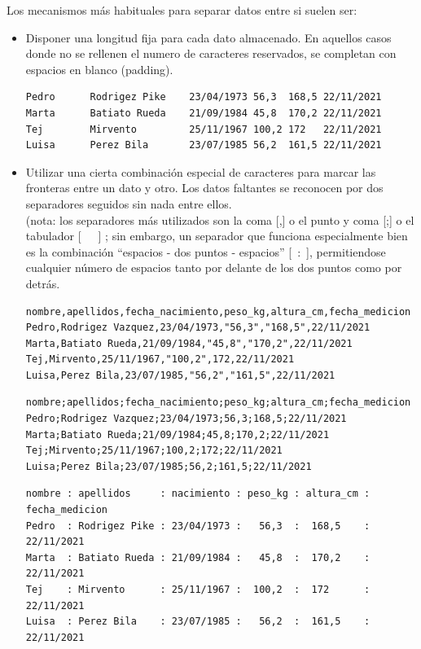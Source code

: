 \documentclass[spanish,12pt,a4paper,final,oneside]{book}
\begin{document}
Los mecanismos más habituales para separar datos entre si suelen ser:
\begin{itemize}
\item Disponer una longitud fija para cada dato almacenado. En aquellos casos donde no se rellenen el numero de caracteres reservados, se completan con espacios en blanco (padding).

\begin{lstlisting}[frame=single, basicstyle=\scriptsize]
Pedro      Rodrigez Pike    23/04/1973 56,3  168,5 22/11/2021
Marta      Batiato Rueda    21/09/1984 45,8  170,2 22/11/2021
Tej        Mirvento         25/11/1967 100,2 172   22/11/2021
Luisa      Perez Bila       23/07/1985 56,2  161,5 22/11/2021
\end{lstlisting}

\item Utilizar una cierta combinación especial de caracteres para marcar las fronteras entre un dato y otro. Los datos faltantes se reconocen por dos separadores seguidos sin nada entre ellos.
\\ (nota: los separadores más utilizados son la coma [,] o el punto y coma [;] o el tabulador [\ \ \ ] ; sin embargo, un separador que funciona especialmente bien es la combinación “espacios - dos puntos - espacios”  [\ :\ ], permitiendose cualquier número de espacios tanto por delante de los dos puntos como por detrás.

\begin{lstlisting}[frame=single, basicstyle=\scriptsize]
nombre,apellidos,fecha_nacimiento,peso_kg,altura_cm,fecha_medicion
Pedro,Rodrigez Vazquez,23/04/1973,"56,3","168,5",22/11/2021
Marta,Batiato Rueda,21/09/1984,"45,8","170,2",22/11/2021
Tej,Mirvento,25/11/1967,"100,2",172,22/11/2021
Luisa,Perez Bila,23/07/1985,"56,2","161,5",22/11/2021
\end{lstlisting}

\begin{lstlisting}[frame=single, basicstyle=\scriptsize]
nombre;apellidos;fecha_nacimiento;peso_kg;altura_cm;fecha_medicion
Pedro;Rodrigez Vazquez;23/04/1973;56,3;168,5;22/11/2021
Marta;Batiato Rueda;21/09/1984;45,8;170,2;22/11/2021
Tej;Mirvento;25/11/1967;100,2;172;22/11/2021
Luisa;Perez Bila;23/07/1985;56,2;161,5;22/11/2021
\end{lstlisting}

\begin{lstlisting}[frame=single, basicstyle=\scriptsize]
nombre : apellidos     : nacimiento : peso_kg : altura_cm : fecha_medicion
Pedro  : Rodrigez Pike : 23/04/1973 :   56,3  :  168,5    : 22/11/2021
Marta  : Batiato Rueda : 21/09/1984 :   45,8  :  170,2    : 22/11/2021
Tej    : Mirvento      : 25/11/1967 :  100,2  :  172      : 22/11/2021
Luisa  : Perez Bila    : 23/07/1985 :   56,2  :  161,5    : 22/11/2021
\end{lstlisting}


\end{itemize}
\end{document}
